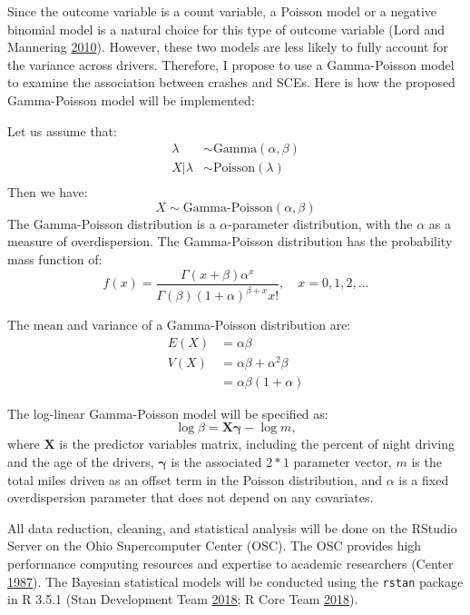 \documentclass[12pt]{book}
\numberwithin{equation}{chapter}
\begin{document}
Since the outcome variable is a count variable, a Poisson model or a negative binomial model is a natural choice for this type of outcome variable (Lord and Mannering \protect\hyperlink{ref-lord2010statistical}{2010}). However, these two models are less likely to fully account for the variance across drivers. Therefore, I propose to use a Gamma-Poisson model to examine the association between crashes and SCEs. Here is how the proposed Gamma-Poisson model will be implemented:

Let us assume that:
\[
\begin{aligned}
\lambda & \sim \text{Gamma}(\alpha, \beta)\\
X|\lambda & \sim \text{Poisson}(\lambda)\\
\end{aligned}
\]
Then we have:
\[X \sim \text{Gamma-Poisson}(\alpha, \beta)\]
The Gamma-Poisson distribution is a \(\alpha\)-parameter distribution, with the \(\alpha\) as a measure of overdispersion. The Gamma-Poisson distribution has the probability mass function of:
\[f(x) = \frac{\Gamma(x + \beta)\alpha^x}{\Gamma(\beta)(1 + \alpha)^{\beta + x}x!}, \quad x = 0, 1, 2, \dots\]

The mean and variance of a Gamma-Poisson distribution are:
\[
\begin{aligned}
E(X) & = \alpha\beta \\
V(X) & = \alpha\beta + \alpha^2\beta\\
     & = \alpha\beta(1 + \alpha)
\end{aligned}
\]

The log-linear Gamma-Poisson model will be specified as:
\[
\log\beta = \mathbf{X\gamma} - \log m,
\]
where \(\mathbf{X}\) is the predictor variables matrix, including the percent of night driving and the age of the drivers, \(\mathbf{\gamma}\) is the associated \(2*1\) parameter vector, \(m\) is the total miles driven as an offset term in the Poisson distribution, and \(\alpha\) is a fixed overdispersion parameter that does not depend on any covariates.

All data reduction, cleaning, and statistical analysis will be done on the RStudio Server on the Ohio Supercomputer Center (OSC). The OSC provides high performance computing resources and expertise to academic researchers (Center \protect\hyperlink{ref-OSC1987}{1987}). The Bayesian statistical models will be conducted using the \texttt{rstan} package in R 3.5.1 (Stan Development Team \protect\hyperlink{ref-rstancitation}{2018}; R Core Team \protect\hyperlink{ref-Rcitation}{2018}).
\end{document}
